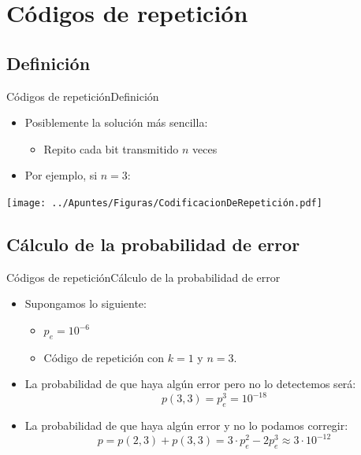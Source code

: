 \documentclass[10pt,compress]{beamer} %
\begin{document}
\section{Códigos de repetición}

\subsection{Definición}
\begin{frame}{Códigos de repetición}{Definición}
	\begin{itemize}
		\item Posiblemente la solución más sencilla:
		\begin{itemize}
			\item Repito cada bit transmitido $n$ veces
		\end{itemize}
		\item Por ejemplo, si $n=3$:
	\end{itemize}
	\centering \texttt{[image: ../Apuntes/Figuras/CodificacionDeRepetición.pdf]}
\end{frame}

\subsection{Cálculo de la probabilidad de error}
\begin{frame}{Códigos de repetición}{Cálculo de la probabilidad de error}
\begin{itemize}
  \item Supongamos lo siguiente:
  \begin{itemize}
    \item $p_e = 10^{-6}$
    \item Código de repetición con $k=1$ y $n=3$.
  \end{itemize}
  \item La probabilidad de que haya algún error pero no lo detectemos será:
  \begin{displaymath}
    p(3,3) = p_e^3 = 10^{-18}
  \end{displaymath}
  \item La probabilidad de que haya algún error y no lo podamos corregir:
  \begin{displaymath}
    p = p(2,3) + p(3,3) = 3 \cdot p_e^2 - 2p_e^3 \approx 3 \cdot 10^{-12}
  \end{displaymath}
\end{itemize}
\end{frame}
\end{document}
